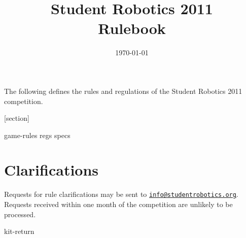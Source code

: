 \documentclass[a4paper, 12pt]{scrartcl}
\title {Student Robotics 2011\\ Rulebook}
\date{\today}
\begin{document}
\maketitle

\noindent The following defines the rules and regulations of the Student Robotics 2011 competition.

[section]
\newcommand{\rcn}{\stepcounter{rule}\arabic{section}.\arabic{rule}}
\renewcommand{\labelenumi}{\rcn}

 {game-rules}
\newpage
 {regs}
\newpage
 {specs}

\section{Clarifications}
Requests for rule clarifications may be sent to \href{mailto:info@studentrobotics.org}{\nolinkurl{info@studentrobotics.org}}.  Requests received within one month of the competition are unlikely to be processed.

\newpage
\appendix
\appendixpage
\addappheadtotoc
 {kit-return}
\end{document}
